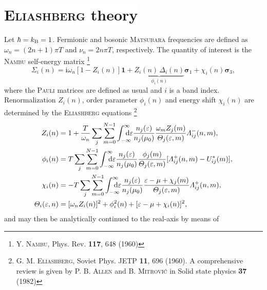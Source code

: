 \documentclass[a4paper]{article}
\def\D{\mathrm d}
\def\I{\mathrm i}
\def\sub#1{\sb{\mathrm{#1}}}
\def\from#1{\sb{\mathrlap{#1}}}
\def\till#1{\sp{\mathrlap{#1}}}
\let\vec\boldsymbol
\let\Delta\varDelta
\let\epsilon\varepsilon
\let\Lambda\varLambda
\let\Sigma\varSigma
\let\Theta\varTheta
\def\headline#1{\section*{%
   \normalsize\normalfont%
   \rlap{\rule[0.5ex]\textwidth{0.4pt}}%
   \qquad\colorbox{white}{#1}%
   }}
\begin{document}
   \headline{\textsc{Eliashberg} theory}

   Let $\hbar = k \sub B = 1$. Fermionic and bosonic \textsc{Matsubara}
   frequencies are defined as $\omega_n = (2 n + 1) \pi T$ and $\nu_n = 2 n \pi
   T$, respectively. The quantity of interest is the \textsc{Nambu} self-energy
   matrix%
   \footnote{Y. \textsc{Nambu}, Phys. Rev. \textbf{117}, 648 (1960)}
   \begin{equation*}
      \vec \Sigma_i(n)
      = \I \omega_n [1 - Z_i(n)] \vec 1
      + \underbrace{Z_i(n) \, \Delta_i(n)}
      _ {\displaystyle \phi_i(n)} \vec \sigma_1
      + \chi_i(n) \vec \sigma_3,
   \end{equation*}
   where the \textsc{Pauli} matrices are defined as usual and $i$ is a band
   index. Renormalization $Z_i(n)$, order parameter $\phi_i(n)$ and energy shift
   $\chi_i(n)$ are determined by the \textsc{Eliashberg} equations%
   \footnote{%
      G. M. \textsc{Eliashberg}, Soviet Phys. JETP \textbf{11}, 696 (1960).
      \newline
      A comprehensive review is given by P. B. \textsc{Allen} and B.
      \textsc{Mitrović} in Solid state physics \textbf{37} (1982)
      }
   \begin{equation}
      \begin{split}
         Z_i(n) &= 1 + \frac T {\omega_n} \sum_j \sum_{m = 0}^{N - 1}
         \int \from{-\infty} \till \infty \D \epsilon
         \frac{n_j(\epsilon)}{n_j(\mu_0)}
         \frac{\omega_m Z_j (m)}{\Theta_j(\epsilon, m)}
         \Lambda_{i j}^-(n, m),
         \\
         \phi_i(n) &= T \sum_j \sum_{m = 0}^{N - 1}
         \int \from{-\infty} \till \infty \D \epsilon
         \frac{n_j(\epsilon)}{n_j(\mu_0)}
         \frac{\phi_j(m)}{\Theta_j(\epsilon, m)}
         [\Lambda_{i j}^+(n, m) - U^*_{i j}(m)],
         \\
         \chi_i(n) &= -T \sum_j \sum_{m = 0}^{N - 1}
         \int \from{-\infty} \till \infty \D \epsilon
         \frac{n_j(\epsilon)}{n_j(\mu_0)}
         \frac{\epsilon - \mu + \chi_j(m)}{\Theta_j(\epsilon, m)}
         \Lambda_{i j}^+(n, m),
         \\
         \Theta_i(\epsilon, n) &=
         [\omega_n Z_i(n)]^2 + \phi_i^2(n) + [\epsilon - \mu + \chi_i(n)]^2,
      \end{split}
      \label{Eliashberg equations}
   \end{equation}
   and may then be analytically continued to the real-axis by means of
\end{document}
